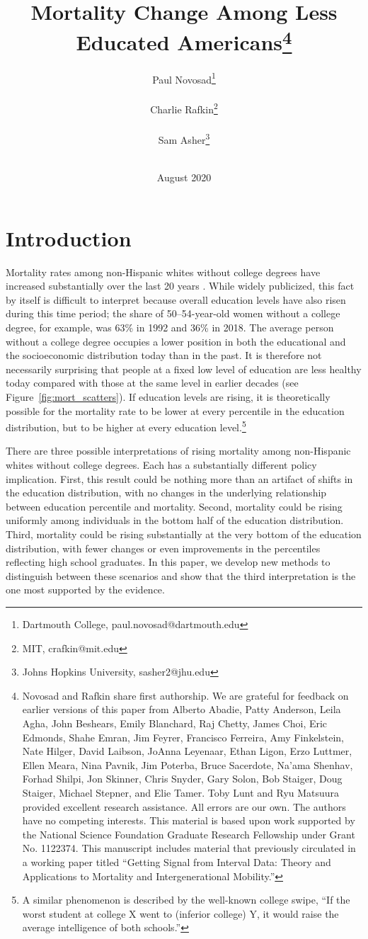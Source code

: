 \documentclass[12pt,letterpaper]{article}
\title{Mortality Change Among Less Educated Americans\footnote{Novosad and Rafkin share first authorship. We are grateful for feedback on earlier versions of
    this paper from Alberto Abadie, Patty
    Anderson, Leila Agha, John Beshears, Emily Blanchard, Raj Chetty,
    James Choi, Eric Edmonds, Shahe Emran, Jim Feyrer, Francisco
    Ferreira, Amy
    Finkelstein, Nate Hilger, David Laibson, JoAnna Leyenaar, Ethan
    Ligon, Erzo Luttmer, Ellen Meara, Nina Pavnik, Jim Poterba, Bruce
    Sacerdote, Na'ama Shenhav, Forhad Shilpi, Jon Skinner, Chris
    Snyder, Gary Solon, Bob Staiger, Doug
    Staiger, Michael Stepner, and Elie Tamer. Toby Lunt and Ryu
    Matsuura provided excellent research assistance. All errors are our own. The authors have no competing interests. This
    material is based upon work supported by the National Science
    Foundation Graduate Research Fellowship under Grant No. 1122374. This
    manuscript includes material that previously circulated in a
    working paper titled ``Getting Signal from Interval
    Data: Theory and Applications to Mortality and Intergenerational
    Mobility.''}}
\author{Paul Novosad\thanks{Dartmouth College,
    paul.novosad@dartmouth.edu} \\ \\ Charlie Rafkin\thanks{MIT,
    crafkin@mit.edu} \\ \\ Sam Asher\thanks{Johns Hopkins
    University, sasher2@jhu.edu} \\ \\ }
\numberwithin{equation}{section}
\begin{document}
\date{August 2020}

\maketitle\thispagestyle{empty}


\begin{abstract}



\end{abstract}

\newpage
\clearpage
\setcounter{page}{1}
 \doublespacing

\section{Introduction}
\label{sec:intro}

Mortality rates among non-Hispanic whites without college degrees have
increased substantially over the last 20 years
\citep{Meara2008,Cutler2010,Cutler2011,Olshansky2012,Case2015,Case2017}.
While widely publicized, this fact by itself is difficult to interpret
because overall education levels have also risen during this time
period; the share of 50--54-year-old women without a college degree,
for example, was 63\% in 1992 and 36\% in 2018. The average person
without a college degree occupies a lower position in both the
educational and the socioeconomic distribution today than in the
past. It is therefore not necessarily surprising that people at a
fixed low level of education are less healthy today compared with
those at the same level in earlier decades (see
Figure~\ref{fig:mort_scatters}). If education levels are rising, it is
theoretically possible for the mortality rate to be lower at
every percentile in the education distribution, but to be higher at
every education level.\footnote{A similar phenomenon is described by
  the well-known college swipe, ``If the worst student at college X went to (inferior college) Y, it would raise the average intelligence of both schools.''}

There are three possible interpretations of rising mortality among non-Hispanic whites without college degrees. Each has a substantially different policy implication. First, this result could be nothing more than an artifact of shifts in the education distribution, with no changes in the underlying relationship between education percentile and mortality. Second, mortality could be rising uniformly among individuals in the bottom half of the education distribution. Third, mortality could be rising substantially at the very bottom of the education distribution, with fewer changes or even improvements in the percentiles reflecting high school graduates. In this paper, we develop new methods to distinguish between these scenarios and show that the third interpretation is the one most supported by the evidence.
\end{document}
